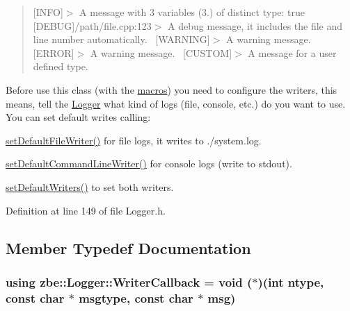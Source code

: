 \begin{quote}
\mbox{[}I\+N\+F\+O\mbox{]}$>$ A message with 3 variables (3.) of distinct type\+: true~\newline
\mbox{[}D\+E\+B\+U\+G\mbox{]}/path/file.cpp\+:123$>$ A debug message, it includes the file and line number automatically.~\newline
\mbox{[}W\+A\+R\+N\+I\+N\+G\mbox{]}$>$ A warning message.~\newline
\mbox{[}E\+R\+R\+O\+R\mbox{]}$>$ A warning message.~\newline
\mbox{[}C\+U\+S\+T\+O\+M\mbox{]}$>$ A message for a user defined type.~\newline
\end{quote}


Before use this class (with the \hyperlink{_logger_8h}{macros}) you need to configure the writers, this means, tell the \hyperlink{classzbe_1_1_logger}{Logger} what kind of logs (file, console, etc.) do you want to use. You can set default writes calling\+:
\begin{DoxyItemize}
\item {\ttfamily \hyperlink{classzbe_1_1_logger_a9f8153d2ff5de8545989862aec26756b}{set\+Default\+File\+Writer()}} for file logs, it writes to {\ttfamily ./system.log}.
\item {\ttfamily \hyperlink{classzbe_1_1_logger_a799c5a801abd4851abcd809d6ef988e3}{set\+Default\+Command\+Line\+Writer()}} for console logs (write to {\ttfamily stdout}).
\item {\ttfamily \hyperlink{classzbe_1_1_logger_a9385884e177d21ed09623f52500ef1b1}{set\+Default\+Writers()}} to set both writers. 
\end{DoxyItemize}

Definition at line 149 of file Logger.\+h.



\subsection{Member Typedef Documentation}
\hypertarget{classzbe_1_1_logger_a6b5096e1cd8e8af221619572797cc838}{}
\subsubsection[{Writer\+Callback}]{\setlength{\rightskip}{0pt plus 5cm}using {\bf zbe\+::\+Logger\+::\+Writer\+Callback} =  void ($\ast$)(int ntype, const char $\ast$ msgtype, const char $\ast$ msg)}\label{classzbe_1_1_logger_a6b5096e1cd8e8af221619572797cc838}


